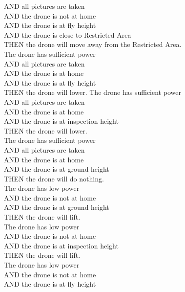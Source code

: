 \documentclass{article}
\begin{document}
\indent AND all pictures are taken\\
\indent AND the drone is not at home\\
\indent AND the drone is at fly height\\
\indent AND the drone is close to Restricted Area\\
\indent THEN the drone will move away from the Restricted Area.
\newline\\
The drone has sufficient power\\
\indent AND all pictures are taken\\
\indent AND the drone is at home\\
\indent AND the drone is at fly height\\
\indent THEN the drone will lower.
\newpage
\noindent
The drone has sufficient power\\
\indent AND all pictures are taken\\
\indent AND the drone is at home\\
\indent AND the drone is at inspection height\\
\indent THEN the drone will lower.
\newline\\
The drone has sufficient power\\
\indent AND all pictures are taken\\
\indent AND the drone is at home\\
\indent AND the drone is at ground height\\
\indent THEN the drone will do nothing.
\newline\\
The drone has low power\\
\indent AND the drone is not at home\\
\indent AND the drone is at ground height\\
\indent THEN the drone will lift.
\newline\\
The drone has low power\\
\indent AND the drone is not at home\\
\indent AND the drone is at inspection height\\
\indent THEN the drone will lift.
\newline\\
The drone has low power\\
\indent AND the drone is not at home\\
\indent AND the drone is at fly height\\
\end{document}
